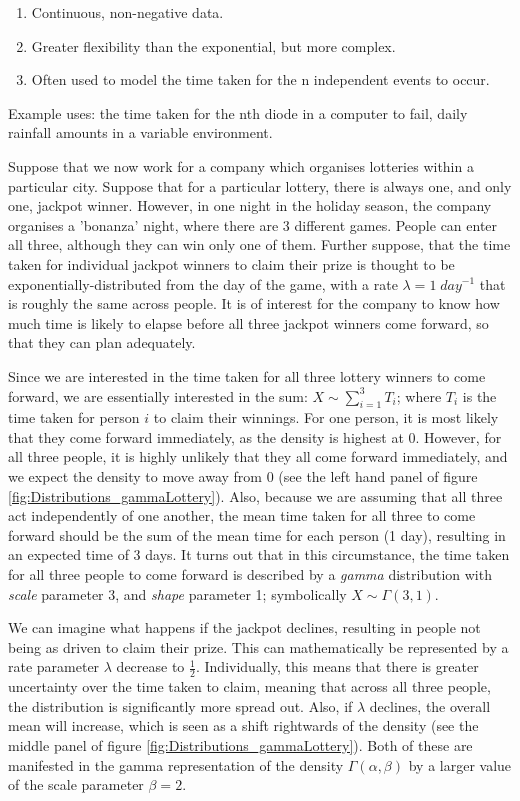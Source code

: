 \documentclass[11pt,fullpage]{book}
\begin{document}
\begin{enumerate} 
\item Continuous, non-negative data.
\item Greater flexibility than the exponential, but more complex.
\item Often used to model the time taken for the n independent events to occur.
\end{enumerate}

Example uses: the time taken for the nth diode in a computer to fail, daily rainfall amounts in a variable environment.

Suppose that we now work for a company which organises lotteries within a particular city. Suppose that for a particular lottery, there is always one, and only one, jackpot winner. However, in one night in the holiday season, the company organises a 'bonanza' night, where there are 3 different games. People can enter all three, although they can win only one of them. Further suppose, that the time taken for individual jackpot winners to claim their prize is thought to be exponentially-distributed from the day of the game, with a rate $\lambda=1\; day^{-1}$  that is roughly the same across people. It is of interest for the company to know how much time is likely to elapse before all three jackpot winners come forward, so that they can plan adequately. 

Since we are interested in the time taken for all three lottery winners to come forward, we are essentially interested in the sum: $X\sim \sum\limits_{i=1}^{3} T_i$; where $T_i$ is the time taken for person $i$ to claim their winnings. For one person, it is most likely that they come forward immediately, as the density is highest at 0. However, for all three people, it is highly unlikely that they all come forward immediately, and we expect the density to move away from 0 (see the left hand panel of figure \ref{fig:Distributions_gammaLottery}). Also, because we are assuming that all three act independently of one another, the mean time taken for all three to come forward should be the sum of the mean time for each person (1 day), resulting in an expected time of 3 days. It turns out that in this circumstance, the time taken for all three people to come forward is described by a \textit{gamma} distribution with \textit{scale} parameter 3, and \textit{shape} parameter 1; symbolically $X\sim \Gamma(3,1)$. 

We can imagine what happens if the jackpot declines, resulting in people not being as driven to claim their prize. This can mathematically be represented by a rate parameter $\lambda$ decrease to $\frac{1}{2}$. Individually, this means that there is greater uncertainty over the time taken to claim, meaning that across all three people, the distribution is significantly more spread out. Also, if $\lambda$ declines, the overall mean will increase, which is seen as a shift rightwards of the density (see the middle panel of figure \ref{fig:Distributions_gammaLottery}). Both of these are manifested in the gamma representation of the density $\Gamma(\alpha,\beta)$ by a larger value of the scale parameter $\beta=2$.
\end{document}
